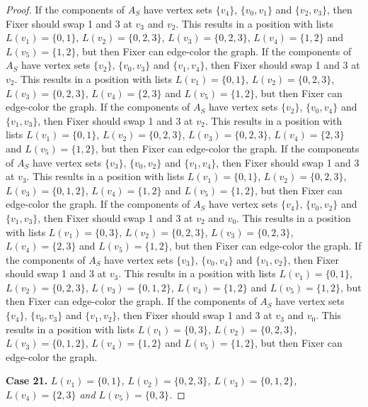 \documentclass[12pt]{amsart}
\theoremstyle{plain}
\theoremstyle{definition}
\theoremstyle{remark}
\begin{document}
\begin{proof}
If the components of $A_S$ have vertex sets $\{v_4\}$, $\{v_0, v_1\}$ and $\{v_2, v_3\}$, then Fixer should swap 1 and 3 at $v_3$ and $v_2$. This results in a position with lists $L(v_1) = \{0, 1\}$, $L(v_2) = \{0, 2, 3\}$, $L(v_3) = \{0, 2, 3\}$, $L(v_4) = \{1, 2\}$ and $L(v_5) = \{1, 2\}$, but then Fixer can edge-color the graph.
If the components of $A_S$ have vertex sets $\{v_2\}$, $\{v_0, v_3\}$ and $\{v_1, v_4\}$, then Fixer should swap 1 and 3 at $v_2$. This results in a position with lists $L(v_1) = \{0, 1\}$, $L(v_2) = \{0, 2, 3\}$, $L(v_3) = \{0, 2, 3\}$, $L(v_4) = \{2, 3\}$ and $L(v_5) = \{1, 2\}$, but then Fixer can edge-color the graph.
If the components of $A_S$ have vertex sets $\{v_2\}$, $\{v_0, v_4\}$ and $\{v_1, v_3\}$, then Fixer should swap 1 and 3 at $v_2$. This results in a position with lists $L(v_1) = \{0, 1\}$, $L(v_2) = \{0, 2, 3\}$, $L(v_3) = \{0, 2, 3\}$, $L(v_4) = \{2, 3\}$ and $L(v_5) = \{1, 2\}$, but then Fixer can edge-color the graph.
If the components of $A_S$ have vertex sets $\{v_3\}$, $\{v_0, v_2\}$ and $\{v_1, v_4\}$, then Fixer should swap 1 and 3 at $v_3$. This results in a position with lists $L(v_1) = \{0, 1\}$, $L(v_2) = \{0, 2, 3\}$, $L(v_3) = \{0, 1, 2\}$, $L(v_4) = \{1, 2\}$ and $L(v_5) = \{1, 2\}$, but then Fixer can edge-color the graph.
If the components of $A_S$ have vertex sets $\{v_4\}$, $\{v_0, v_2\}$ and $\{v_1, v_3\}$, then Fixer should swap 1 and 3 at $v_2$ and $v_0$. This results in a position with lists $L(v_1) = \{0, 3\}$, $L(v_2) = \{0, 2, 3\}$, $L(v_3) = \{0, 2, 3\}$, $L(v_4) = \{2, 3\}$ and $L(v_5) = \{1, 2\}$, but then Fixer can edge-color the graph.
If the components of $A_S$ have vertex sets $\{v_3\}$, $\{v_0, v_4\}$ and $\{v_1, v_2\}$, then Fixer should swap 1 and 3 at $v_3$. This results in a position with lists $L(v_1) = \{0, 1\}$, $L(v_2) = \{0, 2, 3\}$, $L(v_3) = \{0, 1, 2\}$, $L(v_4) = \{1, 2\}$ and $L(v_5) = \{1, 2\}$, but then Fixer can edge-color the graph.
If the components of $A_S$ have vertex sets $\{v_4\}$, $\{v_0, v_3\}$ and $\{v_1, v_2\}$, then Fixer should swap 1 and 3 at $v_3$ and $v_0$. This results in a position with lists $L(v_1) = \{0, 3\}$, $L(v_2) = \{0, 2, 3\}$, $L(v_3) = \{0, 1, 2\}$, $L(v_4) = \{1, 2\}$ and $L(v_5) = \{1, 2\}$, but then Fixer can edge-color the graph.

\noindent\textbf{Case 21.  }\textit{$L(v_1) = \{0, 1\}$, $L(v_2) = \{0, 2, 3\}$, $L(v_3) = \{0, 1, 2\}$, $L(v_4) = \{2, 3\}$ and $L(v_5) = \{0, 3\}$.}


\end{proof}
\end{document}
